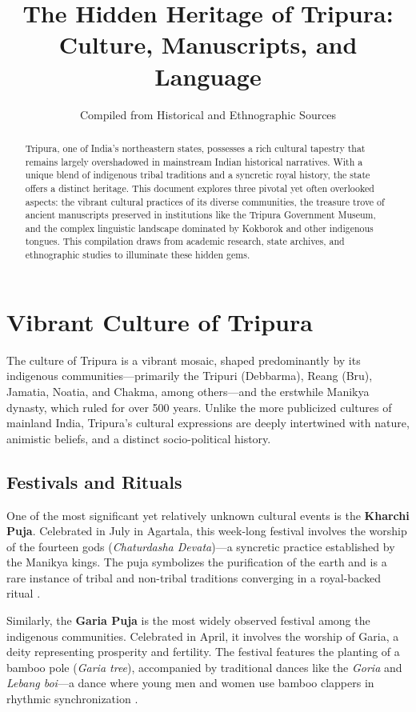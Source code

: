 \documentclass{article}
\title{The Hidden Heritage of Tripura: Culture, Manuscripts, and Language}
\author{Compiled from Historical and Ethnographic Sources}
\date{}
\begin{document}
\maketitle

\begin{abstract}
Tripura, one of India's northeastern states, possesses a rich cultural tapestry that remains largely overshadowed in mainstream Indian historical narratives. With a unique blend of indigenous tribal traditions and a syncretic royal history, the state offers a distinct heritage. This document explores three pivotal yet often overlooked aspects: the vibrant cultural practices of its diverse communities, the treasure trove of ancient manuscripts preserved in institutions like the Tripura Government Museum, and the complex linguistic landscape dominated by Kokborok and other indigenous tongues. This compilation draws from academic research, state archives, and ethnographic studies to illuminate these hidden gems.
\end{abstract}

\section{Vibrant Culture of Tripura}

The culture of Tripura is a vibrant mosaic, shaped predominantly by its indigenous communities—primarily the Tripuri (Debbarma), Reang (Bru), Jamatia, Noatia, and Chakma, among others—and the erstwhile Manikya dynasty, which ruled for over 500 years. Unlike the more publicized cultures of mainland India, Tripura's cultural expressions are deeply intertwined with nature, animistic beliefs, and a distinct socio-political history.

\subsection{Festivals and Rituals}
One of the most significant yet relatively unknown cultural events is the \textbf{Kharchi Puja}. Celebrated in July in Agartala, this week-long festival involves the worship of the fourteen gods (\textit{Chaturdasha Devata})—a syncretic practice established by the Manikya kings. The puja symbolizes the purification of the earth and is a rare instance of tribal and non-tribal traditions converging in a royal-backed ritual \cite{debroy2018}.

Similarly, the \textbf{Garia Puja} is the most widely observed festival among the indigenous communities. Celebrated in April, it involves the worship of Garia, a deity representing prosperity and fertility. The festival features the planting of a bamboo pole (\textit{Garia tree}), accompanied by traditional dances like the \textit{Goria} and \textit{Lebang boi}—a dance where young men and women use bamboo clappers in rhythmic synchronization \cite{chakraborty2006}.
\end{document}
